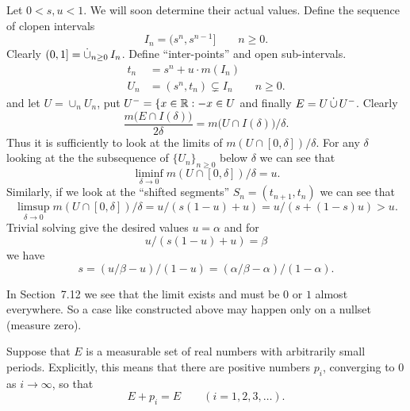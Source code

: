 \begin{enumerate}
Let \(0< s,u < 1\). We will soon determine their actual values.
Define %
the sequence of clopen intervals 
\begin{equation*}
I_n = (s^n,s^{n-1}] \qquad n \geq 0.
\end{equation*}
Clearly \((0,1] = \disjunion_{n\geq 0} I_n\).
Define ``inter-points'' and open sub-intervals.
\begin{align*}
t_n &= s^n + u\cdot m(I_n) \\
U_n &= (s^n, t_n) \subsetneq I_n \qquad n \geq 0.
\end{align*}
and let \(U = \cup_n U_n\), put \(U^- = \{x\in\mathbb{R}: -x \in U\)
and finally \(E = U \disjunion U^-\).
Clearly 
\begin{equation*}
\frac{m\bigl(E\cap I(\delta)\bigr)}{2\delta} 
= m\bigl(U\cap I(\delta)\bigr) / \delta.
\end{equation*}
Thus it is sufficiently to look at the limits of 
\(m(U\cap [0,\delta]) / \delta\).
For any \(\delta\) looking at the 
the subsequence of \(\{U_n\}_{n\geq 0}\) below \(\delta\)
we can see that
\begin{equation*}
\liminf_{\delta\to 0} m(U\cap [0,\delta]) / \delta = u.
\end{equation*}
Similarly, if we look at the ``shifted segments'' \(S_n = (t_{n+1},t_n)\)
we can see that
\begin{equation*}
\limsup_{\delta\to 0} m(U\cap [0,\delta]) / \delta 
= u / (s(1-u) + u) = u / (s + (1-s)u) > u.
\end{equation*}
Trivial solving give the desired values \(u=\alpha\)
and for
\begin{equation*}
u / (s(1-u) + u) = \beta
\end{equation*}
we have
\begin{equation*}
s 
= (u / \beta - u) / (1-u)
= (\alpha / \beta - \alpha) / (1-\alpha).
\end{equation*}

In Section~7.12 we see that the limit exists and must be $0$ or $1$
almost everywhere. 
So a case like constructed above may happen only on a nullset (measure zero). 

\begin{excopy}
Suppose that $E$ is a measurable set of real numbers with arbitrarily
small periods. Explicitly,
this means that there are positive numbers \(p_i\), converging to $0$
as \(i\to \infty\), so that 
\begin{equation*}
E + p_i = E \qquad (i=1,2,3,\ldots).
\end{equation*}


\end{excopy}
\end{enumerate}

